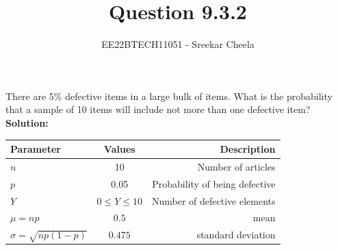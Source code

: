 \documentclass[journal,12pt,onecolumn]{IEEEtran}
\begin{document}
\newcommand{\solution}{\noindent \textbf{Solution: }}
\newcommand{\cosec}{\,\text{cosec}\,}
\providecommand{\dec}[2]{\ensuremath{\overset{#1}{\underset{#2}{\gtrless}}}}
\newcommand{\myvec}[1]{\ensuremath{\begin{pmatrix}#1\end{pmatrix}}}
\newcommand{\mydet}[1]{\ensuremath{\begin{vmatrix}#1\end{vmatrix}}}
\newcommand{\myaugvec}[2]{\ensuremath{\begin{amatrix}{#1}#2\end{amatrix}}}
\providecommand{\rank}{\text{rank}}
\providecommand{\pr}[1]{\ensuremath{\Pr\left(#1\right)}}
\providecommand{\qfunc}[1]{\ensuremath{Q\left(#1\right)}}
	\newcommand*{\permcomb}[4][0mu]{{{}^{#3}\mkern#1#2_{#4}}}
\newcommand*{\perm}[1][-3mu]{\permcomb[#1]{P}}
\newcommand*{\comb}[1][-1mu]{\permcomb[#1]{C}}
\providecommand{\qfunc}[1]{\ensuremath{Q\left(#1\right)}}
\providecommand{\gauss}[2]{\mathcal{N}\ensuremath{\left(#1,#2\right)}}
\providecommand{\diff}[2]{\ensuremath{\frac{d{#1}}{d{#2}}}}
\providecommand{\myceil}[1]{\left \lceil #1 \right \rceil }
\newcommand\figref{Fig.~\ref}
\newcommand\tabref{Table~\ref}
\newcommand{\sinc}{\,\text{sinc}\,}
\newcommand{\rect}{\,\text{rect}\,}
\let\vec\mathbf
\vspace{3cm}
\title{
  Question 9.3.2
}
\author{EE22BTECH11051 - Sreekar Cheela}
\maketitle
There are 5\% defective items in a large bulk of items. What is the probability that a sample of 10 items will include not more than one defective item?\\
\fi
\solution\\
\begin{table}[h!]
    \begin{center}
       \begin{tabular}{|l|c|r|}
       \hline
       Parameter & Values & Description\\
       \hline
       $n$ & 10 & Number of articles\\
       \hline
       $p$ & 0.05 & Probability of being defective\\
       \hline
       $Y$ & $0\leq Y \leq 10$
       &  Number of defective elements\\
       \hline
       $\mu=np$ & $0.5$ & mean\\
       \hline
       $\sigma=\sqrt{np(1-p)}$ & $0.475$ & standard deviation\\
       \hline
       \end{tabular}
       \end{center}
   \end{table}
\end{document}
